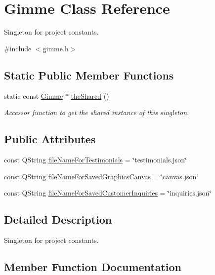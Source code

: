 \hypertarget{class_gimme}{}\section{Gimme Class Reference}
\label{class_gimme}


Singleton for project constants.  




{\ttfamily \#include $<$gimme.\+h$>$}

\subsection*{Static Public Member Functions}
\begin{DoxyCompactItemize}
\item 
static const \mbox{\hyperlink{class_gimme}{Gimme}} $\ast$ \mbox{\hyperlink{class_gimme_a919dd9390c493f42f847039d024f9f80}{the\+Shared}} ()
\begin{DoxyCompactList}\small\item\em Accessor function to get the shared instance of this singleton. \end{DoxyCompactList}\end{DoxyCompactItemize}
\subsection*{Public Attributes}
\begin{DoxyCompactItemize}
\item 
const Q\+String \mbox{\hyperlink{class_gimme_aa9fd95a9aa3dc9734d4f8357c4620efa}{file\+Name\+For\+Testimonials}} = \char`\"{}testimonials.\+json\char`\"{}
\item 
const Q\+String \mbox{\hyperlink{class_gimme_a75f442cedd5b873cc9982a812ac56c8f}{file\+Name\+For\+Saved\+Graphics\+Canvas}} = \char`\"{}canvas.\+json\char`\"{}
\item 
const Q\+String \mbox{\hyperlink{class_gimme_aa9b6e0a689535736ab697a54e40ef5fc}{file\+Name\+For\+Saved\+Customer\+Inquiries}} = \char`\"{}inquiries.\+json\char`\"{}
\end{DoxyCompactItemize}


\subsection{Detailed Description}
Singleton for project constants. 



\subsection{Member Function Documentation}
\mbox{\label{class_gimme_a919dd9390c493f42f847039d024f9f80}} 
